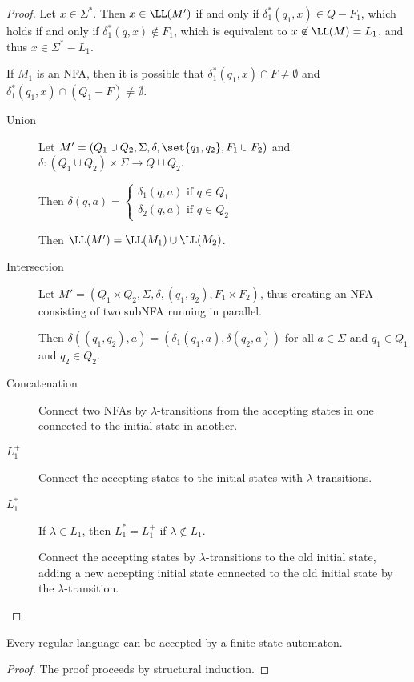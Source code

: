\documentclass[11pt]{scrartcl}
\begin{document}
\begin{proof}
  \hfill

  Let $x\in \Sigma^{*}$. Then $x\in \LL(M')$ if and only if
  $\delta_1^{*}(q_1, x) \in Q - F_1$, which holds if and only
  if $\delta_1^{*}(q, x)\not \in F_1$, which is equivalent to
  $x\not\in \LL(M)= L_1$, and thus $x\in \Sigma^{*} - L_1$.

  If $M_1$ is an NFA, then it is possible that
  $\delta_1^{*}(q_1, x)\cap F \neq \emptyset$ and
  $\delta_1^{*}(q_1, x) \cap (Q_1-F)\neq \emptyset$.

  \begin{description}

  \item[Union] 
\hfill

Let $M' = (Q_1\cup Q_2, \Sigma, \delta, \set{q_1, q_2}, F_1\cup F_2)$
and $\delta: (Q_1\cup Q_2)\times \Sigma \to Q\cup Q_2$.

Then $\delta(q, a) = 
\begin{cases}
  \delta_1(q, a) \text{ if $q\in Q_1$ }\\
  \delta_2(q, a) \text{ if $q\in Q_2$ }
\end{cases}
$

Then $\LL(M') = \LL(M_1)\cup \LL(M_2)$.
\item[Intersection] 
\hfill

Let $M' = (Q_1\times Q_2, \Sigma, \delta, (q_1, q_2), F_1\times F_2)$,
thus creating an NFA consisting of two subNFA running in parallel.

Then $\delta((q_1, q_2), a) = (\delta_1(q_1, a), \delta(q_2, a))$ for
all $a\in \Sigma$ and $q_1\in Q_1$ and $q_2\in Q_2$.

\item[Concatenation] 

  Connect two NFAs by $\lambda$-transitions from the accepting
  states in one connected to the initial state in another.
\item[$L_1^{+}$]

Connect the accepting states to the initial states with $\lambda$-transitions.
\item[$L_1^*$] 

If $\lambda \in L_1$, then $L_1^{*} = L_1^+$ if $\lambda \not \in L_1$.

Connect the accepting states by $\lambda$-transitions to the old
initial state, adding a new accepting initial state connected to the
old initial state by the $\lambda$-transition.
  \end{description}
\end{proof}
\begin{corollary}
Every regular language can be accepted by a finite state automaton.
\end{corollary}

\begin{proof}
  \hfill

The proof proceeds by structural induction.
\end{proof}
\end{document}
